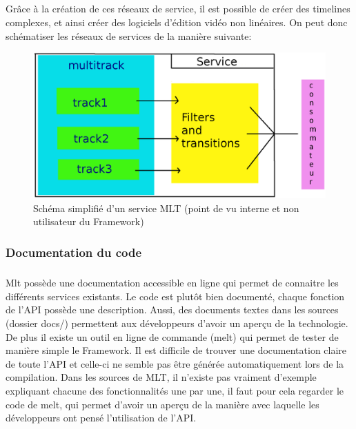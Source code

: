 \subparagraph{}

Grâce à la création de ces réseaux de service, il est possible de
créer des timelines complexes, et ainsi créer des logiciels d'édition
vidéo non linéaires. On peut donc schématiser les réseaux de services
de la manière suivante:

\begin{figure} [H]

  \begin{center}

    \includegraphics[width=1.0\textwidth]{images/service}

  \end{center}

  \caption{Schéma simplifié d'un service MLT (point de vu
  interne et
    non utilisateur du Framework)}

  \label{Yes}

\end{figure}

\subsubsection{Documentation du code}

\subparagraph{}

Mlt possède une documentation accessible en ligne qui permet de
connaitre les différents services existants. Le code est plutôt bien
documenté, chaque fonction de l'API possède une description. Aussi,
des documents textes dans les sources (dossier docs/) permettent aux
développeurs d'avoir un aperçu de la technologie. De plus il existe
un outil en ligne de commande (melt) qui permet de tester de manière
simple le Framework. Il est difficile de trouver
une documentation claire de toute l'API et celle-ci ne semble pas être
générée automatiquement lors de la compilation. Dans les sources de
MLT, il n'existe pas vraiment d'exemple expliquant chacune
des fonctionnalités une par une, il faut pour cela regarder le code
de melt, qui permet d'avoir un aperçu de la manière avec laquelle les
développeurs ont pensé l'utilisation de l'API.

